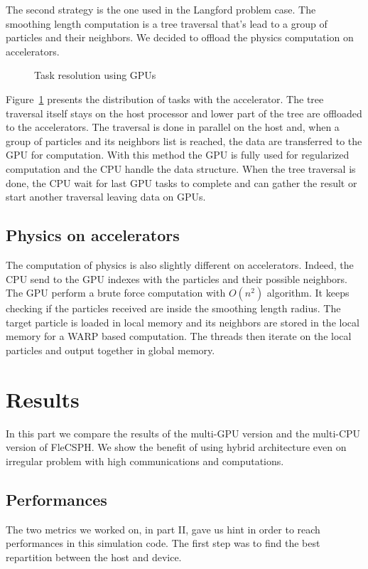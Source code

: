 The second strategy is the one used in the Langford problem case. 
The smoothing length computation is a tree traversal that's lead to a group of particles and their neighbors. 
We decided to offload the physics computation on accelerators. 

\begin{figure}[t!]

\caption{Task resolution using GPUs}
\label{fig:multi_gpu_implementation}
\end{figure}
Figure~\ref{fig:multi_gpu_implementation} presents the distribution of tasks with the accelerator. 
The tree traversal itself stays on the host processor and lower part of the tree are offloaded to the accelerators. 
The traversal is done in parallel on the host and, when a group of particles and its neighbors list is reached, the data are transferred to the GPU for computation. 
With this method the GPU is fully used for regularized computation and the CPU handle the data structure. 
When the tree traversal is done, the CPU wait for last GPU tasks to complete and can gather the result or start another traversal leaving data on GPUs. 

\subsection{Physics on accelerators}
The computation of physics is also slightly different on accelerators. 
Indeed, the CPU send to the GPU indexes with the particles and their possible neighbors. 
The GPU perform a brute force computation with $O(n^2)$ algorithm. 
It keeps checking if the particles received are inside the smoothing length radius. 
The target particle is loaded in local memory and its neighbors are stored in the local memory for a WARP based computation.
The threads then iterate on the local particles and output together in global memory.

\section{Results}
In this part we compare the results of the multi-GPU version and the multi-CPU version of FleCSPH. 
We show the benefit of using hybrid architecture even on irregular problem with high communications and computations.

\subsection{Performances}
The two metrics we worked on, in part II, gave us hint in order to reach performances in this simulation code. 
The first step was to find the best repartition between the host and device.

